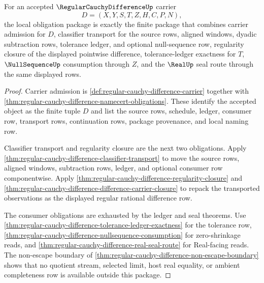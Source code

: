 \begin{theorem}
\label{thm:regular-cauchy-difference-obligation-package}
For an accepted $\RegularCauchyDifferenceUp$ carrier
$$
D=(X,Y,S,T,Z,H,C,P,N),
$$
the local obligation package is exactly the finite package that combines carrier admission for $D$, classifier transport for the source rows, aligned windows, dyadic subtraction rows, tolerance ledger, and optional null-sequence row, regularity closure of the displayed pointwise difference, tolerance-ledger exactness for $T$, $\NullSequenceUp$ consumption through $Z$, and the $\RealUp$ seal route through the same displayed rows.
\end{theorem}
\begin{proof}
Carrier admission is \autoref{def:regular-cauchy-difference-carrier} together with \autoref{thm:regular-cauchy-difference-namecert-obligations}. These identify the accepted object as the finite tuple $D$ and list the source rows, schedule, ledger, consumer row, transport rows, continuation rows, package provenance, and local naming row.

Classifier transport and regularity closure are the next two obligations. Apply \autoref{thm:regular-cauchy-difference-classifier-transport} to move the source rows, aligned windows, subtraction rows, ledger, and optional consumer row componentwise. Apply \autoref{thm:regular-cauchy-difference-regularity-closure} and \autoref{thm:regular-cauchy-difference-difference-carrier-closure} to repack the transported observations as the displayed regular rational difference row.

The consumer obligations are exhausted by the ledger and seal theorems. Use \autoref{thm:regular-cauchy-difference-tolerance-ledger-exactness} for the tolerance row, \autoref{thm:regular-cauchy-difference-nullsequence-consumption} for zero-shrinkage reads, and \autoref{thm:regular-cauchy-difference-real-seal-route} for Real-facing reads. The non-escape boundary of \autoref{thm:regular-cauchy-difference-non-escape-boundary} shows that no quotient stream, selected limit, host real equality, or ambient completeness row is available outside this package.
\end{proof}

